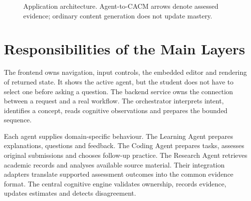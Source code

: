 \begin{figure}[htbp]\centering
{}
\caption{Application architecture. Agent-to-CACM arrows denote assessed evidence; ordinary content generation does not update mastery.}\label{fig:architecture}
\end{figure}

\section{Responsibilities of the Main Layers}
The frontend owns navigation, input controls, the embedded editor and rendering of returned state. It shows the active agent, but the student does not have to select one before asking a question. The backend service owns the connection between a request and a real workflow. The orchestrator interprets intent, identifies a concept, reads cognitive observations and prepares the bounded sequence.

Each agent supplies domain-specific behaviour. The Learning Agent prepares explanations, questions and feedback. The Coding Agent prepares tasks, assesses original submissions and chooses follow-up practice. The Research Agent retrieves academic records and analyses available source material. Their integration adapters translate supported assessment outcomes into the common evidence format. The central cognitive engine validates ownership, records evidence, updates estimates and detects disagreement.

